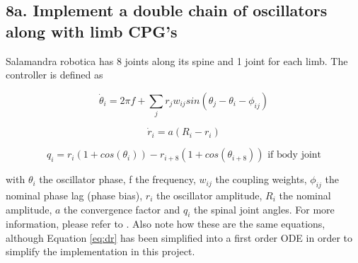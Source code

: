 \documentclass{cmc}
\begin{document}
\subsection*{8a. Implement a double chain of oscillators along with
  limb CPG's}
\label{sec:implement-chain}

Salamandra robotica has 8 joints along its spine and 1 joint for each
limb. The controller is defined as

\begin{equation}
  \label{eq:dphase}
  \dot{\theta}_i = 2 \pi f + \sum_j r_j w_{ij} sin(\theta_j - \theta_i - \phi_{ij})
\end{equation}

\begin{equation}
  \label{eq:dr}
  \dot{r}_i = a (R_i - r_i)
\end{equation}

\begin{equation}
  \label{eq:output}
  q_i = r_i(1 + cos(\theta_i)) - r_{i+8}(1 + cos(\theta_{i+8})) \text{ if body joint}
\end{equation}

with $ \theta_i $ the oscillator phase, f the frequency, $ w_{ij} $ the coupling
weights, $ \phi_{ij} $ the nominal phase lag (phase bias), $ r_i $ the
oscillator amplitude, $ R_i $ the nominal amplitude, $ a $ the convergence
factor and $ q_i $ the spinal joint angles. For more information, please refer
to \cite{ijspeert2007swimming}. Also note how these are the same equations,
although Equation \eqref{eq:dr} has been simplified into a first order ODE in
order to simplify the implementation in this project.
\end{document}
